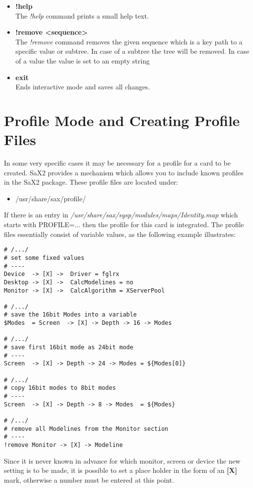 \begin{itemize}
\item  \textbf{!help}\\
       The \textit{!help} command prints a small help text.

\item  \textbf{!remove <sequence>}\\
       The \textit{!remove} command removes the given sequence
       which is a key path to a specific value or subtree. In case of
       a subtree the tree will be removed. In case of a value the value
       is set to an empty string

\item  \textbf{exit}\\
       Ends interactive mode and saves all changes.
\end{itemize}

\section{Profile Mode and Creating Profile Files}
In some very specific cases it may be necessary for a profile for a card to be
created. SaX2 provides a mechanism which allows you to include known profiles
in the SaX2 package. These profile files are located under:\\
\begin{itemize}
\item /usr/share/sax/profile/
\end{itemize}
If there is an entry in
\textit{/usr/share/sax/sysp/modules/maps/Identity.map} 
which starts with PROFILE=... then the profile for this card is
integrated. The profile files essentially consist of variable values, as the
following example illustrates:
\begin{verbatim}
# /.../
# set some fixed values
# ----
Device  -> [X] ->  Driver = fglrx
Desktop -> [X] ->  CalcModelines = no
Monitor -> [X] ->  CalcAlgorithm = XServerPool

# /.../
# save the 16bit Modes into a variable
$Modes  = Screen  -> [X] -> Depth -> 16 -> Modes

# /.../
# save first 16bit mode as 24bit mode
# ----
Screen  -> [X] -> Depth -> 24 -> Modes = ${Modes[0]}

# /.../
# copy 16bit modes to 8bit modes
# ----
Screen  -> [X] -> Depth -> 8 -> Modes  = ${Modes}

# /.../
# remove all Modelines from the Monitor section
# ----
!remove Monitor -> [X] -> Modeline
\end{verbatim}
Since it is never known in advance for which monitor, screen or device the new
setting is to be made, it is possible to set a place holder in the form of an  
\textbf{[X]} mark, otherwise a number must be entered at this point.
